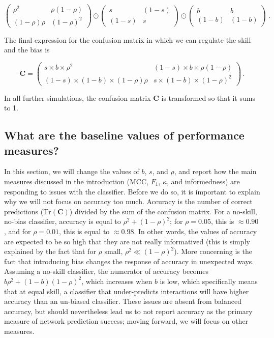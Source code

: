 \documentclass[11pt]{article}
\begin{document}
\[
\begin{pmatrix}
    \rho^2 & \rho (1-\rho) \\
    (1-\rho) \rho & (1-\rho)^2
\end{pmatrix} \odot \begin{pmatrix}
    s & (1-s) \\
    (1-s) & s
\end{pmatrix} \odot \begin{pmatrix}
    b & b \\
    (1-b) & (1-b)
\end{pmatrix}\,.
\]

The final expression for the confusion matrix in which we can regulate
the skill and the bias is

\[
\mathbf{C} = \begin{pmatrix}
    s\times b\times \rho^2 & (1-s)\times b\times \rho (1-\rho) \\
    (1-s)\times (1-b)\times (1-\rho) \rho & s\times (1-b)\times (1-\rho)^2
\end{pmatrix} \,.
\]

In all further simulations, the confusion matrix \(\mathbf{C}\) is
transformed so that it sums to 1.

\hypertarget{what-are-the-baseline-values-of-performance-measures}{%
\subsection{What are the baseline values of performance
measures?}\label{what-are-the-baseline-values-of-performance-measures}}

In this section, we will change the values of \(b\), \(s\), and
\(\rho\), and report how the main measures discussed in the introduction
(MCC, \(F_1\), \(\kappa\), and informedness) are responding to issues
with the classifier. Before we do so, it is important to explain why we
will not focus on accuracy too much. Accuracy is the number of correct
predictions (\(\text{Tr}(\mathbf{C})\)) divided by the sum of the
confusion matrix. For a no-skill, no-bias classifier, accuracy is equal
to \(\rho^2 + (1-\rho)^2\); for \(\rho = 0.05\), this is
\(\approx 0.90\), and for \(\rho = 0.01\), this is equal to
\(\approx 0.98\). In other words, the values of accuracy are expected to
be so high that they are not really informatived (this is simply
explained by the fact that for \(\rho\) small,
\(\rho^2 \ll (1-\rho)^2\)). More concerning is the fact that introducing
bias changes the response of accuracy in unexpected ways. Assuming a
no-skill classifier, the numerator of accuracy becomes
\(b\rho^2 + (1-b)(1-\rho)^2\), which increases when \(b\) is low, which
specifically means that at equal skill, a classifier that under-predicts
interactions will have higher accuracy than an un-biased classifier.
These issues are absent from balanced accuracy, but should nevertheless
lead us to not report accuracy as the primary measure of network
prediction success; moving forward, we will focus on other measures.
\end{document}
